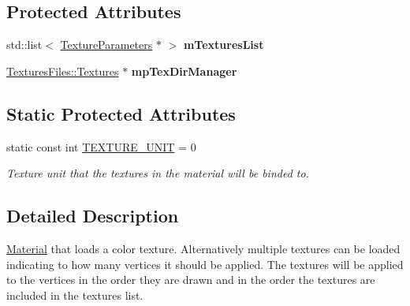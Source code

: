 \subsection*{Protected Attributes}
\begin{DoxyCompactItemize}
\item 
\mbox{\label{class_geometry_engine_1_1_geometry_material_1_1_texture_material_ae2480940b9ea9c623ce3b68e5ccb28fe}} 
std\+::list$<$ \mbox{\hyperlink{class_geometry_engine_1_1_geometry_material_1_1_texture_parameters}{Texture\+Parameters}} $\ast$ $>$ {\bfseries m\+Textures\+List}
\item 
\mbox{\label{class_geometry_engine_1_1_geometry_material_1_1_texture_material_ae5437f3c43d11457400ea462809d5e33}} 
\mbox{\hyperlink{class_textures_files_1_1_textures}{Textures\+Files\+::\+Textures}} $\ast$ {\bfseries mp\+Tex\+Dir\+Manager}
\end{DoxyCompactItemize}
\subsection*{Static Protected Attributes}
\begin{DoxyCompactItemize}
\item 
\mbox{\label{class_geometry_engine_1_1_geometry_material_1_1_texture_material_a5728fe450875f732ce65025cba6dacb0}} 
static const int \mbox{\hyperlink{class_geometry_engine_1_1_geometry_material_1_1_texture_material_a5728fe450875f732ce65025cba6dacb0}{T\+E\+X\+T\+U\+R\+E\+\_\+\+U\+N\+IT}} = 0
\begin{DoxyCompactList}\small\item\em Texture unit that the textures in the material will be binded to. \end{DoxyCompactList}\end{DoxyCompactItemize}


\subsection{Detailed Description}
\mbox{\hyperlink{class_geometry_engine_1_1_geometry_material_1_1_material}{Material}} that loads a color texture. Alternatively multiple textures can be loaded indicating to how many vertices it should be applied. The textures will be applied to the vertices in the order they are drawn and in the order the textures are included in the textures list. 

